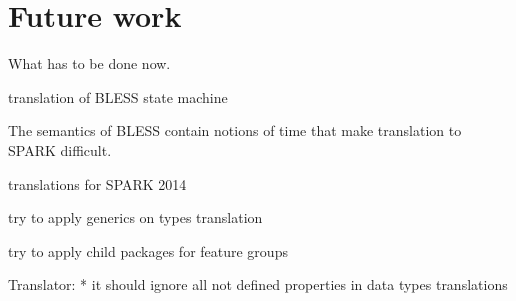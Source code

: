 
\cleardoublepage

\chapter{Future work}
\label{future_work}

What has to be done now.

translation of BLESS state machine

The semantics of BLESS contain notions of time that make translation to SPARK difficult.

translations for SPARK 2014

try to apply generics on types translation

try to apply child packages for feature groups

Translator:
* it should ignore all not defined properties in data types translations